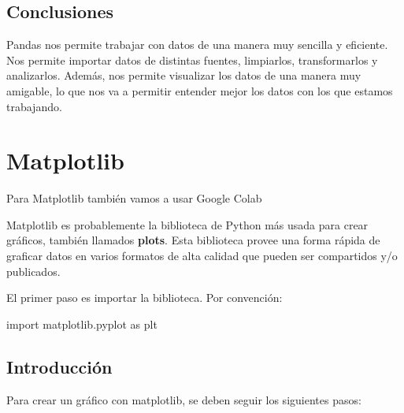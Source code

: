 \documentclass[
  letterpaper,
  DIV=11,
  numbers=noendperiod]{scrreprt}
\newenvironment{Shaded}{\begin{snugshade}}{\end{snugshade}}
\newcommand{\ImportTok}[1]{\textcolor[rgb]{0.00,0.46,0.62}{#1}}
\newcommand{\NormalTok}[1]{\textcolor[rgb]{0.00,0.23,0.31}{#1}}
\begin{document}
\subsection{Conclusiones}\label{conclusiones-2}

Pandas nos permite trabajar con datos de una manera muy sencilla y
eficiente. Nos permite importar datos de distintas fuentes, limpiarlos,
transformarlos y analizarlos. Además, nos permite visualizar los datos
de una manera muy amigable, lo que nos va a permitir entender mejor los
datos con los que estamos trabajando.

\section{Matplotlib}\label{matplotlib}

\begin{tcolorbox}[enhanced jigsaw, opacitybacktitle=0.6, toptitle=1mm, toprule=.15mm, arc=.35mm, breakable, bottomrule=.15mm, opacityback=0, leftrule=.75mm, rightrule=.15mm, title=\textcolor{quarto-callout-note-color}{\faInfo}\hspace{0.5em}{Note}, left=2mm, bottomtitle=1mm, colframe=quarto-callout-note-color-frame, colback=white, titlerule=0mm, coltitle=black, colbacktitle=quarto-callout-note-color!10!white]

Para Matplotlib también vamos a usar Google Colab

\end{tcolorbox}

Matplotlib es probablemente la biblioteca de Python más usada para crear
gráficos, también llamados \textbf{plots}. Esta biblioteca provee una
forma rápida de graficar datos en varios formatos de alta calidad que
pueden ser compartidos y/o publicados.

El primer paso es importar la biblioteca. Por convención:

\begin{Shaded}
\begin{Highlighting}[]
\ImportTok{import}\NormalTok{ matplotlib.pyplot }\ImportTok{as}\NormalTok{ plt}
\end{Highlighting}
\end{Shaded}

\subsection{Introducción}\label{introducciuxf3n-2}

Para crear un gráfico con matplotlib, se deben seguir los siguientes
pasos:
\end{document}
